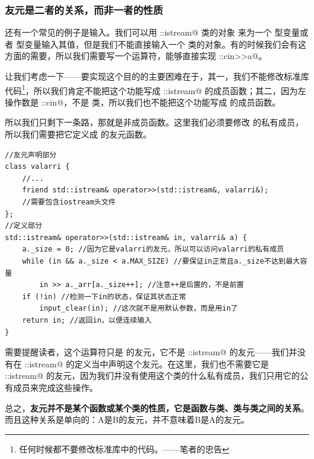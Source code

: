 \subsubsection*{友元是二者的关系，而非一者的性质}
还有一个常见的例子是输入。我们可以用 \lstinline@std::istream@ 类的对象 \lstinline@cin@ 来为一个 \lstinline@int@ 型变量或者 \lstinline@double@ 型变量输入其值，但是我们不能直接输入一个 \lstinline@valarri@ 类的对象。有的时候我们会有这方面的需要，所以我们需要写一个运算符，能够直接实现 \lstinline@std::cin>>a@。\par
让我们考虑一下——要实现这个目的的主要困难在于，其一，我们不能修改标准库代码\footnote{任何时候都不要修改标准库中的代码。——笔者的忠告}，所以我们肯定不能把这个功能写成 \lstinline@std::istream@ 的成员函数；其二，因为左操作数是 \lstinline@std::cin@，不是 \lstinline@valarri@ 类，所以我们也不能把这个功能写成 \lstinline@valarri@ 的成员函数。\par
所以我们只剩下一条路，那就是非成员函数。这里我们必须要修改 \lstinline@valarri@ 的私有成员，所以我们需要把它定义成 \lstinline@valari@ 的友元函数。
\begin{lstlisting}
//友元声明部分
class valarri {
    //...
    friend std::istream& operator>>(std::istream&, valarri&);
    //需要包含iostream头文件
};
//定义部分
std::istream& operator>>(std::istream& in, valarri& a) {
    a._size = 0; //因为它是valarri的友元，所以可以访问valarri的私有成员
    while (in && a._size < a.MAX_SIZE) //要保证in正常且a._size不达到最大容量
        in >> a._arr[a._size++]; //注意++是后置的，不是前置
    if (!in) //检测一下in的状态，保证其状态正常
        input_clear(in); //这次就不是用默认参数，而是用in了
    return in; //返回in，以便连续输入
}
\end{lstlisting}
需要提醒读者，这个运算符只是 \lstinline@valarri@ 的友元，它不是 \lstinline@std::istream@ 的友元——我们并没有在 \lstinline@std::istream@ 的定义当中声明这个友元。在这里，我们也不需要它是 \lstinline@std::istream@ 的友元，因为我们并没有使用这个类的什么私有成员，我们只用它的公有成员来完成这些操作。\par
总之，\textbf{友元并不是某个函数或某个类的性质，它是函数与类、类与类之间的关系}。而且这种关系是单向的：A是B的友元，并不意味着B是A的友元。\par
